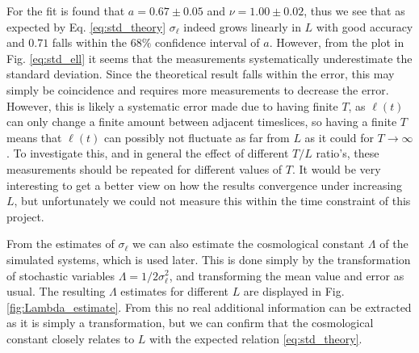 For the fit is found that $a = 0.67 \pm 0.05$ and $\nu = 1.00 \pm 0.02$, thus we see that as expected by Eq. \eqref{eq:std_theory} $\sigma_\ell$ indeed grows linearly in $L$ with good accuracy and $0.71$ falls within the $68\%$ confidence interval of $a$.
However, from the plot in Fig. \ref{eq:std_ell} it seems that the measurements systematically underestimate the standard deviation.
Since the theoretical result falls within the error, this may simply be coincidence and requires more measurements to decrease the error.
However, this is likely a systematic error made due to having finite $T$, as $\ell(t)$ can only change a finite amount between adjacent timeslices, so having a finite $T$ means that $\ell(t)$ can possibly not fluctuate as far from $L$ as it could for $T \rightarrow \infty$.
To investigate this, and in general the effect of different $T/L$ ratio's, these measurements should be repeated for different values of $T$.
It would be very interesting to get a better view on how the results convergence under increasing $L$, but unfortunately we could not measure this within the time constraint of this project.

From the estimates of $\sigma_\ell$ we can also estimate the cosmological constant $\Lambda$ of the simulated systems, which is used later. This is done simply by the transformation of stochastic variables $\Lambda = 1/2\sigma_\ell^2$, and transforming the mean value and error as usual.
The resulting $\Lambda$ estimates for different $L$ are displayed in Fig. \ref{fig:Lambda_estimate}. From this no real additional information can be extracted as it is simply a transformation, but we can confirm that the cosmological constant closely relates to $L$ with the expected relation \eqref{eq:std_theory}.




